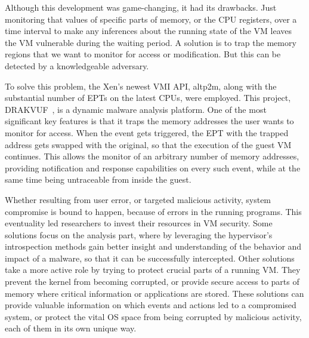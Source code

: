 \par Although this development was game-changing, it had its drawbacks. Just monitoring that values of specific parts of memory, or the \ac{CPU} registers, over a time interval to make any inferences about the running state of the \ac{VM} leaves the \ac{VM} vulnerable during the waiting period. A solution is to trap the memory regions that we want to monitor for access or modification. But this can be detected by a knowledgeable adversary. 

\par To solve this problem, the Xen’s newest \ac{VMI} \ac{API}, altp2m, along with the substantial number of \ac{EPT}s on the latest \ac{CPU}s, were employed. This project, DRAKVUF~\cite{lengyel2014drakvuf}, is a dynamic malware analysis platform. One of the most significant key features is that it traps the memory addresses the user wants to monitor for access. When the event gets triggered, the \ac{EPT} with the trapped address gets swapped with the original, so that the execution of the guest \ac{VM} continues. This allows the monitor of an arbitrary number of memory addresses, providing notification and response capabilities on every such event, while at the same time being untraceable from inside the guest.

\par Whether resulting from user error, or targeted malicious activity, system compromise is bound to happen, because of errors in the running programs. This eventuality led researchers to invest their resources in \ac{VM} security. Some solutions focus on the analysis part, where by leveraging the hypervisor's introspection methods gain better insight and understanding of the behavior and impact of a malware, so that it can be successfully intercepted. Other solutions take a more active role by trying to protect crucial parts of a running \ac{VM}. They prevent the kernel from becoming corrupted, or provide secure access to parts of memory where critical information or applications are stored. 
These solutions can provide valuable information on which events and actions led to a compromised system, or protect the vital \ac{OS} space from being corrupted by malicious activity, each of them in its own unique way. 


